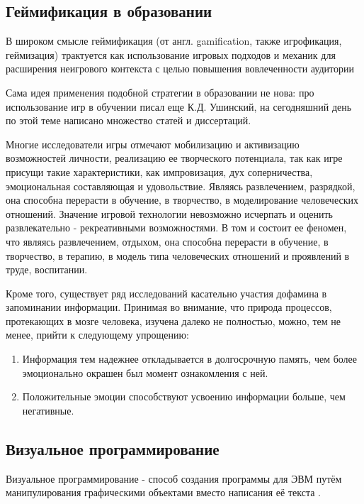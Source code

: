 \subsection{Геймификация в образовании}

В широком смысле геймификация (от англ. gamification, также игрофикация, геймизация) трактуется как использование игровых подходов и механик для расширения неигрового контекста с целью повышения вовлеченности аудитории \cite{gamification}

Сама идея применения подобной стратегии в образовании не нова: про использование игр в обучении писал еще К.Д. Ушинский, на сегодняшний день по этой теме написано множество статей и диссертаций.

Многие исследователи игры отмечают мобилизацию и активизацию возможностей личности, реализацию ее творческого потенциала, так как игре присущи такие характеристики, как импровизация, дух соперничества, эмоциональная составляющая и удовольствие. Являясь развлечением, разрядкой, она способна перерасти в обучение, в творчество, в моделирование человеческих отношений. Значение игровой технологии невозможно исчерпать и оценить развлекательно - рекреативными возможностями. В том и состоит ее феномен, что являясь развлечением, отдыхом, она способна перерасти в обучение, в творчество, в терапию, в модель типа человеческих отношений и проявлений в труде, воспитании. \cite{gamification-ed}

Кроме того, существует ряд исследований \cite{d1, d2} касательно участия дофамина в запоминании информации. Принимая во внимание, что природа процессов, протекающих в мозге человека, изучена далеко не полностью, можно, тем не менее, прийти к следующему упрощению: 

\begin{enumerate}
\item Информация тем надежнее откладывается в долгосрочную память, чем более эмоционально окрашен был момент ознакомления с ней.
\item Положительные эмоции способствуют усвоению информации больше, чем негативные.
\end{enumerate}

\subsection{Визуальное программирование}

Визуальное программирование - способ создания программы для ЭВМ путём манипулирования графическими объектами вместо написания её текста \cite{VPL}.


